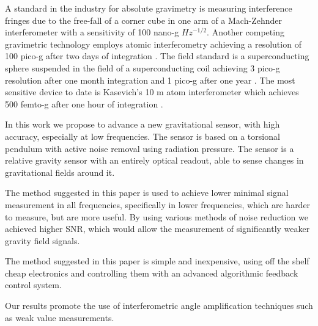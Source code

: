 \documentclass[\main/master.tex]{subfiles}
\begin{document}
\fi
\par\noindent
A standard in the industry for absolute gravimetry is measuring interference fringes due to the free-fall of a corner cube in one arm of a Mach-Zehnder interferometer with a sensitivity of 100 nano-g $Hz^{-1/2}$. Another competing gravimetric technology employs atomic interferometry achieving a resolution of 100 pico-g after two days of integration \cite{Peters01}. 
The field standard is a superconducting sphere suspended in the field of a superconducting coil achieving 3 pico-g resolution after one month integration and 1 pico-g  after one year \cite{Goodkind99}. 
The most sensitive device to date is Kasevich's 10 m atom interferometer which achieves 500 femto-g after one hour of integration \cite{PhysRevA.91.033629,kasevich2014prospects}. 
\par\noindent
In this work we propose to advance a new gravitational sensor, with high accuracy, especially at low frequencies. The sensor is based on a torsional pendulum with active noise removal using radiation pressure. The sensor is a relative gravity sensor with an entirely optical readout, able to sense changes in gravitational fields around it. 
\iffalse
\fi
\par\noindent
The method suggested in this paper is used to achieve lower minimal signal measurement in all frequencies, specifically in lower frequencies, which are harder to measure, but are more useful. By using various methods of noise reduction we achieved higher SNR, which would allow the measurement of significantly weaker gravity field signals.
\par\noindent
The method suggested in this paper is simple and inexpensive, using off the shelf cheap electronics and controlling them with an advanced algorithmic feedback control system.
\par\noindent
Our results promote the use of interferometric angle amplification techniques such as weak value measurements. 
\end{document}
